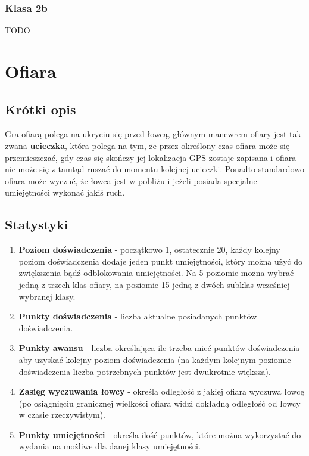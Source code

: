 \documentclass[a4paper,11pt,notitlepage]{article}
\begin{document}
\subsubsection{Klasa 2b}
TODO

\section{Ofiara}
\subsection{Krótki opis}
Gra ofiarą polega na ukryciu się przed łowcą, głównym manewrem ofiary jest tak zwana \textbf{ucieczka}, która polega na tym, że przez określony czas ofiara może się przemieszczać, gdy czas się skończy jej lokalizacja GPS zostaje zapisana i ofiara nie może się z tamtąd ruszać do momentu kolejnej ucieczki. Ponadto standardowo ofiara może wyczuć, że łowca jest w pobliżu i jeżeli posiada specjalne umiejętności wykonać jakiś ruch.

\subsection{Statystyki}
\begin{enumerate}
\item
	\textbf{Poziom doświadczenia} - początkowo 1, ostatecznie 20, każdy kolejny poziom doświadczenia dodaje jeden punkt umiejętności, który można użyć do zwiększenia bądź odblokowania umiejętności. Na 5 poziomie można wybrać jedną z trzech klas ofiary, na poziomie 15 jedną z dwóch subklas wcześniej wybranej klasy.

\item
	\textbf{Punkty doświadczenia} - liczba aktualne posiadanych punktów doświadczenia.
	
\item
	\textbf{Punkty awansu} - liczba określająca ile trzeba mieć punktów doświadczenia aby uzyskać kolejny poziom doświadczenia (na każdym kolejnym poziomie doświadczenia liczba potrzebnych punktów jest dwukrotnie większa).	
	
\item
	\textbf{Zasięg wyczuwania łowcy} - określa odległość z jakiej ofiara wyczuwa łowcę (po osiągnięciu granicznej wielkości ofiara widzi dokładną odległość od łowcy w czasie rzeczywistym). 
	
\item 
	\textbf{Punkty umiejętności} - określa ilość punktów, które można wykorzystać do wydania na możliwe dla danej klasy umiejętności.
\end{enumerate}
\end{document}
